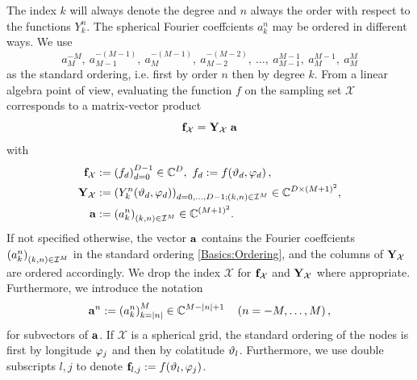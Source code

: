 The index $k$ will always denote the degree and $n$ always the order with respect to the functions $Y_{k}^n$. The spherical Fourier coeffcients $a_{k}^n$ may be ordered 
in different ways. We use
\begin{equation}
  \label{Basics:Ordering}
  a_{M}^{-M},\: a_{M-1}^{-(M-1)},\: a_{M}^{-(M-1)},\: a_{M-2}^{-(M-2)},
  \: \ldots,\: a_{M-1}^{M-1},\: a_{M}^{M-1},\: a_{M}^{M}
\end{equation}
as the standard ordering, i.e. first by order $n$ then by degree $k$.
From a linear algebra point of view, evaluating the function $f$ on the 
sampling set $\mathcal{X}$ corresponds to a matrix-vector product
\[ 
  \mathbf{f}_{\mathcal{X}} = \mathbf{Y}_{\mathcal{X}} \; \mathbf{a}
\]
with
\begin{equation}
  \nonumber
  \begin{split}
    \V{f}_{\mathcal{X}} & := \paren{f_d}_{d=0}^{D-1} \in \C^{D},\ f_{d} := \fun{f}{\vtheta_{d},\vphi_{d}},\\
    \V{Y}_{\mathcal{X}} & := \paren{\fun{Y_k^n}{\vtheta_d,\vphi_d}}_{d=0,\ldots,D-1; 
      \paren{k,n} \in \mathcal{I}^M} \in \C^{D \times \paren{M+1}^2},\\
    \V{a} & := \paren{a_k^n}_{\paren{k,n} \in \mathcal{I}^M} \in \C^{\paren{M+1}^2}.
  \end{split}
\end{equation}
If not specified otherwise, the vector $\mathbf{a}$ contains the Fourier 
coeffcients $\left(a_{k}^n\right)_{(k,n) \in \mathcal{I}^M}$ in the 
standard ordering \eqref{Basics:Ordering}, and the columns of 
$\mathbf{Y}_{\mathcal{X}}$ are ordered accordingly. We drop the 
index $\mathcal{X}$ for $\mathbf{f}_{\mathcal{X}}$ and 
$\mathbf{Y}_{\mathcal{X}}$ where appropriate.
Furthermore, we introduce the notation
\begin{equation}
  \nonumber
  \mathbf{a}^{n} := \left(a_{k}^{n}\right)_{k=|n|}^{M} \in \mathbb{C}^{M-|n|+1} \quad \left(n=-M,\ldots,M\right),
\end{equation} 
for subvectors of $\mathbf{a}$. If $\mathcal{X}$ is a spherical grid, the standard ordering of the nodes is first by longitude $\varphi_{j}$ and then by 
colatitude $\vartheta_{l}$. 
Furthermore, we use double subscripts $l,j$ to denote $\mathbf{f}_{l,j} := f{\hspace{-0.4ex}}\left(\vartheta_{l},\varphi_{j}\right)$.

